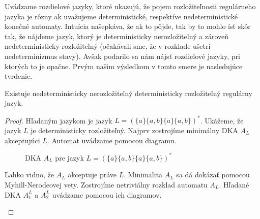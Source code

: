 Uvádzame rozdielové jazyky, ktoré ukazujú, že pojem rozložiteľnosti regulárneho jazyka je rôzny ak uvažujeme deterministické, respektíve nedeterministické konečné automaty. Intuícia našepkáva, že ak to pôjde, tak by to mohlo ísť skôr tak, že nájdeme jazyk, ktorý je deterministicky nerozložiteľný a zároveň nedeterministicky rozložiteľný (očakávali sme, že v rozklade ušetrí nedeterminizmus stavy). Avšak podarilo sa nám nájsť rozdielové jazyky, pri ktorých to je opačne. Prvým našim výsledkom v tomto smere je nasledujúce tvrdenie.

\begin{theorem}
Existuje nedeterministicky nerozložiteľný deterministicky rozložiteľný regulárny jazyk.
\end{theorem}

\begin{proof}
Hľadaným jazykom je jazyk $ L = (\lbrace a \rbrace \lbrace a,b \rbrace \lbrace a \rbrace \lbrace a,b \rbrace)^* $. Ukážeme, že jazyk $ L $ je deterministicky rozložiteľný. Najprv zostrojíme minimálny DKA $ A_{L} $ akceptujúci $ L $. Automat uvádzame pomocou diagramu.

\begin{figure}[H]
\centering
{}
\caption{DKA $ A_{L} $ pre jazyk $ L = (\lbrace a \rbrace \lbrace a,b \rbrace \lbrace a \rbrace \lbrace a,b \rbrace)^* $} \label{fig:DFAa(a|b)a(a|b)^4}
\end{figure}

Ľahko vidno, že $ A_L $ akceptuje práve $ L $. Minimalita $ A_L $ sa dá dokázať pomocou Myhill-Nerodeovej vety. Zostrojíme netriviálny rozklad automatu $ A_L $. Hľadané DKA $ A_1^L $ a $ A_2^L $ uvádzame pomocou ich diagramov.

\begin{figure}[H]
\centering
{}
\end{figure}
\end{proof}
